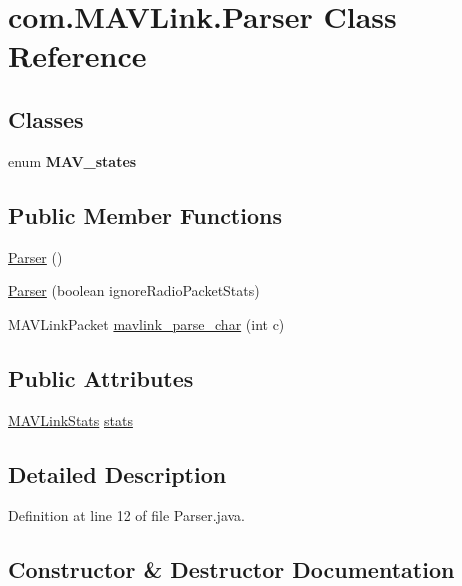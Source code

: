 \hypertarget{classcom_1_1MAVLink_1_1Parser}{}\section{com.\+M\+A\+V\+Link.\+Parser Class Reference}
\label{classcom_1_1MAVLink_1_1Parser}
\subsection*{Classes}
\begin{DoxyCompactItemize}
\item 
enum {\bfseries M\+A\+V\+\_\+states}
\end{DoxyCompactItemize}
\subsection*{Public Member Functions}
\begin{DoxyCompactItemize}
\item 
\mbox{\hyperlink{classcom_1_1MAVLink_1_1Parser_a7a40d6afff53b210e48affe4d33c609c}{Parser}} ()
\item 
\mbox{\hyperlink{classcom_1_1MAVLink_1_1Parser_a133de554c9c5a60a826ce503113a7928}{Parser}} (boolean ignore\+Radio\+Packet\+Stats)
\item 
M\+A\+V\+Link\+Packet \mbox{\hyperlink{classcom_1_1MAVLink_1_1Parser_a07c7cd220c75b191607adf6bed968d04}{mavlink\+\_\+parse\+\_\+char}} (int c)
\end{DoxyCompactItemize}
\subsection*{Public Attributes}
\begin{DoxyCompactItemize}
\item 
\mbox{\hyperlink{classcom_1_1MAVLink_1_1Messages_1_1MAVLinkStats}{M\+A\+V\+Link\+Stats}} \mbox{\hyperlink{classcom_1_1MAVLink_1_1Parser_a877d3b72d9f431b5adca695feb5b7496}{stats}}
\end{DoxyCompactItemize}


\subsection{Detailed Description}


Definition at line 12 of file Parser.\+java.



\subsection{Constructor \& Destructor Documentation}
\mbox{\label{classcom_1_1MAVLink_1_1Parser_a7a40d6afff53b210e48affe4d33c609c}} 
